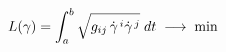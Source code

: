 \documentclass[preview]{standalone}
\begin{document}
\begin{align*}
\special{dvisvgm:raw <g id='unique000'>}L(\gamma) = \int_a^b \sqrt{g_{ij}\,\dot{\gamma}^{\,i}\dot{\gamma}^{\,j}}\;dt\;\longrightarrow\;\min\special{dvisvgm:raw </g>}
\end{align*}
\end{document}
